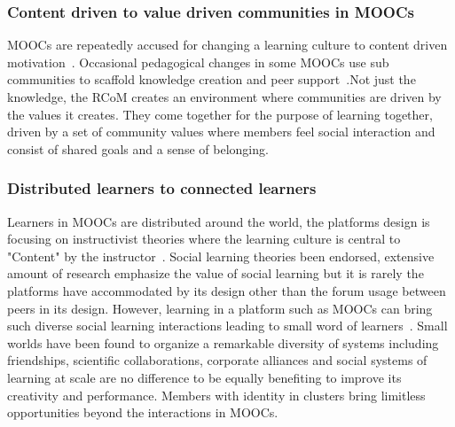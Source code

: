 \documentclass[manuscript,screen,review]{acmart}
\begin{document}
\subsubsection{Content driven to value driven communities in MOOCs} 
MOOCs are repeatedly accused for changing a learning culture to content driven motivation~\cite{wang2015content}. Occasional pedagogical changes in some MOOCs use sub communities to scaffold knowledge creation and peer support~\cite{sharif2015discussion}.Not just the knowledge, the RCoM creates an environment where communities are driven by the values it creates. They come together for the purpose of learning together, driven by a set of community values where members feel social interaction and consist of shared goals and a sense of belonging. 

\subsubsection {Distributed learners to connected learners} 
Learners in MOOCs are distributed around the world, the platforms design is focusing on instructivist theories where the learning culture is central to "Content" by the instructor~\cite{crosslin2016instructivism}. Social learning theories been endorsed, extensive amount of research emphasize the value of social learning but it is rarely the platforms have accommodated by its design other than the forum usage between peers in its design. However, learning in a platform such as MOOCs can bring such diverse social learning interactions leading to small word of learners~\cite{watts1999networks}. Small worlds have been found to organize a remarkable diversity of systems including friendships, scientific collaborations, corporate alliances and social systems of learning at scale are no difference to be equally benefiting to improve its creativity and performance. Members with identity in clusters bring limitless opportunities beyond the interactions in MOOCs.  



\end{document}

